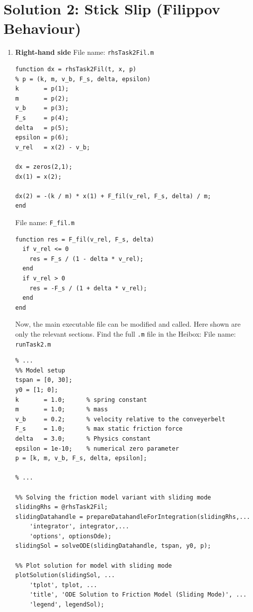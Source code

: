 
\section*{Solution 2: Stick Slip (Filippov Behaviour)}
\begin{enumerate}[label=\alph*)]
\item \textbf{Right-hand side} 
\newline
File name: \texttt{rhsTask2Fil.m}
\begin{lstlisting}
function dx = rhsTask2Fil(t, x, p)
% p = (k, m, v_b, F_s, delta, epsilon)
k       = p(1);
m       = p(2);
v_b     = p(3);
F_s     = p(4);
delta   = p(5);
epsilon = p(6);
v_rel   = x(2) - v_b;

dx = zeros(2,1);
dx(1) = x(2);

dx(2) = -(k / m) * x(1) + F_fil(v_rel, F_s, delta) / m;
end
\end{lstlisting}
File name: \texttt{F\_fil.m}
\begin{lstlisting}
function res = F_fil(v_rel, F_s, delta)
  if v_rel <= 0
    res = F_s / (1 - delta * v_rel);
  end
  if v_rel > 0
    res = -F_s / (1 + delta * v_rel);
  end
end
\end{lstlisting}

\noindent
Now, the main executable file can be modified and called. Here shown are only the relevant sections. Find the full \texttt{.m} file in the Heibox:
File name: \texttt{runTask2.m}
\begin{lstlisting}
% ...
%% Model setup
tspan = [0, 30];
y0 = [1; 0];
k       = 1.0;      % spring constant
m       = 1.0;      % mass
v_b     = 0.2;      % velocity relative to the conveyerbelt
F_s     = 1.0;      % max static friction force
delta   = 3.0;      % Physics constant
epsilon = 1e-10;    % numerical zero parameter
p = [k, m, v_b, F_s, delta, epsilon];

% ...

%% Solving the friction model variant with sliding mode
slidingRhs = @rhsTask2Fil;
slidingDatahandle = prepareDatahandleForIntegration(slidingRhs,... 
	'integrator', integrator,... 
	'options', optionsOde);
slidingSol = solveODE(slidingDatahandle, tspan, y0, p);

%% Plot solution for model with sliding mode
plotSolution(slidingSol, ...
	'tplot', tplot, ...
	'title', 'ODE Solution to Friction Model (Sliding Mode)', ...
	'legend', legendSol);
\end{lstlisting}


\end{enumerate}
